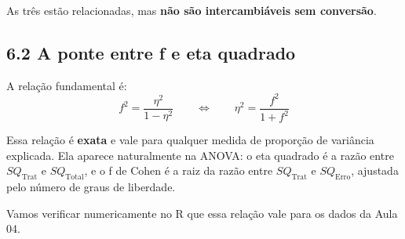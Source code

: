 \documentclass[
]{article}
\begin{document}
As três estão relacionadas, mas \textbf{não são intercambiáveis sem
conversão}.

\subsection{6.2 A ponte entre f e eta
quadrado}\label{a-ponte-entre-f-e-eta-quadrado}

A relação fundamental é:
\[f^2 = \frac{\eta^2}{1 - \eta^2} \qquad \Longleftrightarrow \qquad \eta^2 = \frac{f^2}{1 + f^2}\]

Essa relação é \textbf{exata} e vale para qualquer medida de proporção
de variância explicada. Ela aparece naturalmente na ANOVA: o eta
quadrado é a razão entre \(SQ_{\text{Trat}}\) e \(SQ_{\text{Total}}\), e
o f de Cohen é a raiz da razão entre \(SQ_{\text{Trat}}\) e
\(SQ_{\text{Erro}}\), ajustada pelo número de graus de liberdade.

Vamos verificar numericamente no R que essa relação vale para os dados
da Aula 04.
\end{document}
